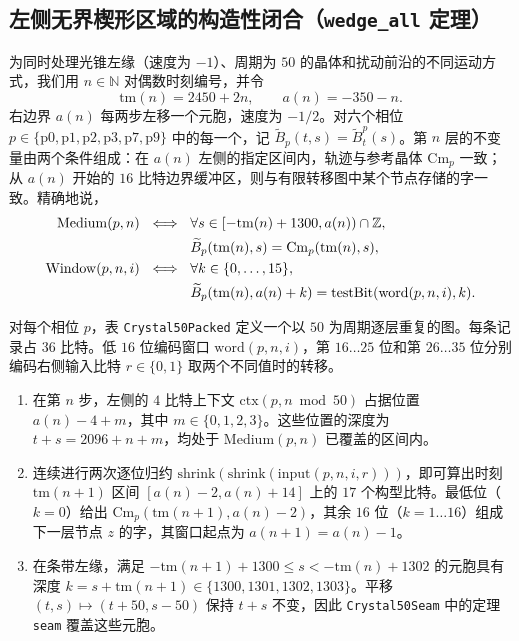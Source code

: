 \subsection{左侧无界楔形区域的构造性闭合（\texttt{wedge\_all} 定理）}

为同时处理光锥左缘（速度为 $-1$）、周期为 $50$ 的晶体和扰动前沿的不同运动方式，我们用 $n \in \mathbb{N}$ 对偶数时刻编号，并令
\begin{equation}
\mathrm{tm}(n) = 2450 + 2n, \qquad a(n) = -350 - n.
\end{equation}
右边界 $a(n)$ 每两步左移一个元胞，速度为 $-1/2$。对六个相位 $p \in \{\mathrm{p0}, \mathrm{p1}, \mathrm{p2}, \mathrm{p3}, \mathrm{p7}, \mathrm{p9}\}$ 中的每一个，记 $\widetilde B_p(t,s)=\widetilde B^p_t(s)$。第 $n$ 层的不变量由两个条件组成：在 $a(n)$ 左侧的指定区间内，轨迹与参考晶体 $\mathrm{Cm}_p$ 一致；从 $a(n)$ 开始的 $16$ 比特边界缓冲区，则与有限转移图中某个节点存储的字一致。精确地说，
\begin{align}
\mathrm{Medium}(p,n)\ \iff\ {}&
\forall s\in[-\mathrm{tm}(n)+1300,a(n))\cap\mathbb{Z},\notag\\
&\widetilde B_p(\mathrm{tm}(n),s)=\mathrm{Cm}_p(\mathrm{tm}(n),s), \\
\mathrm{Window}(p,n,i)\ \iff\ {}&
\forall k\in\{0,\dots,15\},\notag\\
&\widetilde B_p(\mathrm{tm}(n),a(n)+k)=\mathrm{testBit}(\mathrm{word}(p,n,i),k).
\end{align}

\begin{lemma}[16 比特确定性转换器及其与左侧条带的衔接]\label{lem:transducer}
对每个相位 $p$，表 \texttt{Crystal50Packed} 定义一个以 $50$ 为周期逐层重复的图。每条记录占 $36$ 比特。低 $16$ 位编码窗口 $\mathrm{word}(p, n, i)$，第 $16\dots 25$ 位和第 $26\dots 35$ 位分别编码右侧输入比特 $r \in \{0, 1\}$ 取两个不同值时的转移。
\begin{enumerate}[label=(\alph*)]
    \item 在第 $n$ 步，左侧的 $4$ 比特上下文 $\mathrm{ctx}(p, n \bmod 50)$ 占据位置 $a(n) - 4 + m$，其中 $m \in \{0, 1, 2, 3\}$。这些位置的深度为 $t + s = 2096 + n + m$，均处于 $\mathrm{Medium}(p, n)$ 已覆盖的区间内。
    \item 连续进行两次逐位归约 $\mathrm{shrink}(\mathrm{shrink}(\mathrm{input}(p, n, i, r)))$，即可算出时刻 $\mathrm{tm}(n+1)$ 区间 $[a(n)-2, a(n)+14]$ 上的 $17$ 个构型比特。最低位（$k=0$）给出 $\mathrm{Cm}_p(\mathrm{tm}(n+1), a(n) - 2)$，其余 $16$ 位（$k=1\dots 16$）组成下一层节点 $z$ 的字，其窗口起点为 $a(n+1) = a(n) - 1$。
    \item 在条带左缘，满足 $-\mathrm{tm}(n+1) + 1300 \le s < -\mathrm{tm}(n) + 1302$ 的元胞具有深度 $k = s + \mathrm{tm}(n+1) \in \{1300,1301,1302,1303\}$。平移 $(t, s) \mapsto (t + 50, s - 50)$ 保持 $t + s$ 不变，因此 \texttt{Crystal50Seam} 中的定理 \texttt{seam} 覆盖这些元胞。
\end{enumerate}
\end{lemma}

